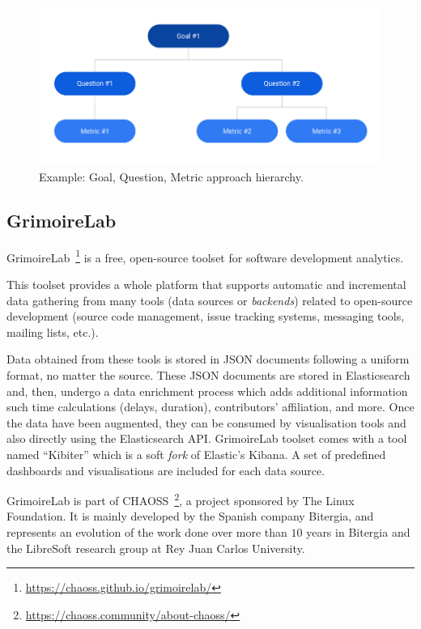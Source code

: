 \documentclass[a4paper, 12pt]{book}
\begin{document}
\begin{figure}
 \centering
  \includegraphics[width=12cm, keepaspectratio]{img/example-gqm-schema}
  \caption{Example: Goal, Question, Metric approach hierarchy.}
  \label{fig:example-gqm-schema}
\end{figure}

\subsection{GrimoireLab}
\label{ssec:GrimoireLab}
GrimoireLab~\footnote{\url{https://chaoss.github.io/grimoirelab/}} is a free, open-source toolset for software development analytics.

This toolset provides a whole platform that supports automatic and incremental data gathering from many tools (data sources or \emph{backends}) related to open-source development (source code management, issue tracking systems, messaging tools, mailing lists, etc.).

Data obtained from these tools is stored in JSON documents following a uniform format, no matter the source. These JSON documents are stored in Elasticsearch and, then, undergo a data enrichment process which adds additional information such time calculations (delays, duration), contributors' affiliation, and more.
Once the data have been augmented, they can be consumed by visualisation tools and also directly using the Elasticsearch API. GrimoireLab toolset comes with a tool named ``Kibiter'' which is a soft \emph{fork} of Elastic's Kibana. A set of predefined dashboards and visualisations are included for each data source.  

GrimoireLab is part of CHAOSS~\footnote{\url{https://chaoss.community/about-chaoss/}}, a project sponsored by The Linux Foundation. It is mainly developed by the Spanish company Bitergia, and represents an evolution of the work done over more than $10$ years in Bitergia and the LibreSoft research group at Rey Juan Carlos University.
\end{document}
